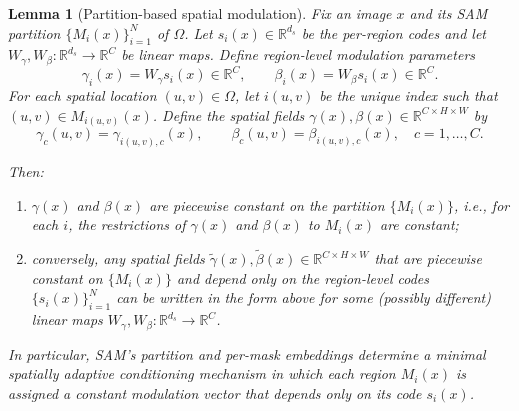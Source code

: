 \documentclass[12pt]{article}
\newtheorem{lemma}{Lemma}
\begin{document}
\begin{lemma}[Partition-based spatial modulation]
\label{lem:partition-modulation}
Fix an image \(x\) and its SAM partition
\(\{M_i(x)\}_{i=1}^N\) of \(\Omega\).
Let \(s_i(x) \in \mathbb{R}^{d_s}\) be the per-region codes and let
\(W_\gamma, W_\beta : \mathbb{R}^{d_s} \to \mathbb{R}^C\) be linear maps.
Define region-level modulation parameters
\[
\gamma_i(x) = W_\gamma s_i(x) \in \mathbb{R}^C, \qquad
\beta_i(x) = W_\beta s_i(x) \in \mathbb{R}^C.
\]
For each spatial location \((u,v) \in \Omega\), let \(i(u,v)\) be the
unique index such that \((u,v) \in M_{i(u,v)}(x)\).
Define the spatial fields \(\gamma(x),\beta(x) \in \mathbb{R}^{C \times H \times W}\) by
\[
\gamma_c(u,v) = \gamma_{i(u,v),c}(x), \qquad
\beta_c(u,v) = \beta_{i(u,v),c}(x),
\quad c = 1,\dots,C.
\]

Then:
\begin{enumerate}
    \item[(a)] \(\gamma(x)\) and \(\beta(x)\) are piecewise constant on
    the partition \(\{M_i(x)\}\), i.e., for each \(i\), the restrictions
    of \(\gamma(x)\) and \(\beta(x)\) to \(M_i(x)\) are constant;
    \item[(b)] conversely, any spatial fields
    \(\tilde{\gamma}(x),\tilde{\beta}(x) \in \mathbb{R}^{C \times H \times W}\)
    that are piecewise constant on \(\{M_i(x)\}\) and depend only on the
    region-level codes \(\{s_i(x)\}_{i=1}^N\) can be written in the form
    above for some (possibly different) linear maps
    \(W_\gamma, W_\beta : \mathbb{R}^{d_s} \to \mathbb{R}^C\).
\end{enumerate}
In particular, SAM's partition and per-mask embeddings determine a
minimal spatially adaptive conditioning mechanism in which each region
\(M_i(x)\) is assigned a constant modulation vector that depends only on
its code \(s_i(x)\).
\end{lemma}
\end{document}
